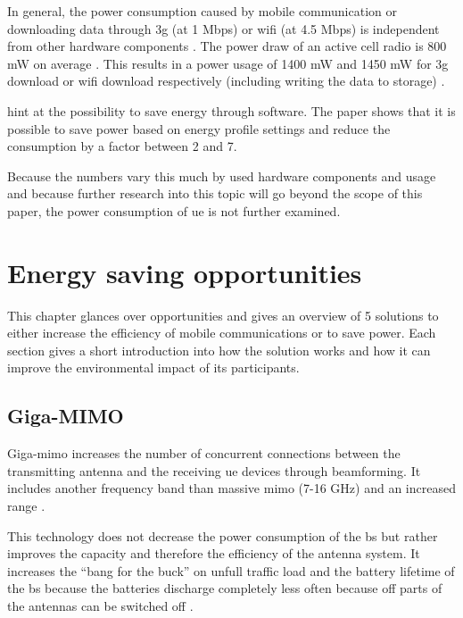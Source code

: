 \documentclass[11pt,a4paper]{article}
\begin{document}
In general, the power consumption caused by mobile communication or downloading data through \acrshort{3g} (at 1 Mbps) or \acrshort{wifi} (at 4.5 Mbps) is independent from other hardware components \citep{smartphoneEnergySurvey}.
The power draw of an active cell radio is 800 mW on average \citep{smartphoneEnergyConsumption}.
This results in a power usage of 1400 mW and 1450 mW for \acrshort{3g} download or \acrshort{wifi} download respectively (including writing the data to storage) \citep{smartphoneEnergySurvey}.

\cite{profilingMobilePower} hint at the possibility to save energy through software.
The paper shows that it is possible to save power based on energy profile settings and reduce the consumption by a factor between 2 and 7.

Because the numbers vary this much by used hardware components and usage and because further research into this topic will go beyond the scope of this paper, the power consumption of \acrlong{ue} is not further examined.

\section{Energy saving opportunities}\label{sec:opportunities}
This chapter glances over opportunities and gives an overview of 5 solutions to either increase the efficiency of mobile communications or to save power.
Each section gives a short introduction into how the solution works and how it can improve the environmental impact of its participants.

\subsection{Giga-MIMO}\label{subsec:gigamimo}
Giga-\acrshort{mimo} increases the number of concurrent connections between the transmitting antenna and the receiving \acrlong{ue} devices through beamforming.
It includes another frequency band than massive \acrshort{mimo} (7-16 GHz) and an increased range \citep{3gpp17}.

This technology does not decrease the power consumption of the \acrlong{bs} but rather improves the capacity and therefore the efficiency of the antenna system.
It increases the \enquote{bang for the buck} on unfull traffic load and the battery lifetime of the \acrshort{bs} because the batteries discharge completely less often because off parts of the antennas can be switched off \citep{qualcomm2022}.
\end{document}
